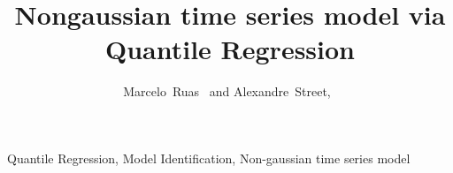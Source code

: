 \documentclass[a4paper]{IEEEtran}
\begin{document}
\title{Nongaussian time series model via Quantile Regression}

\author{Marcelo~Ruas~%
	    and Alexandre~Street,~	


}

\maketitle


\begin{abstract}
	\blindtext
\end{abstract}

\begin{IEEEkeywords}
	Quantile Regression, Model Identification, Non-gaussian time series model
\end{IEEEkeywords}


\listoftodos





%

%
%

%
%





%
%
%	
%
\end{document}

